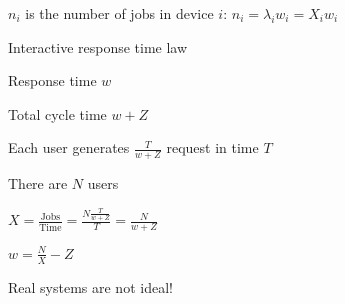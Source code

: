 		\item $n_i$ is the number of jobs in device $i$: $n_i = \lambda_iw_i = X_iw_i$
	\enumend
	\item Interactive response time law
	\enumstart
		\item Response time $w$
		\item Total cycle time $w+Z$
		\item Each user generates $\frac{T}{w+Z}$ request in time $T$
		\item There are $N$ users
		\item $X = \frac{\text{Jobs}}{\text{Time}} = \frac{N\frac{T}{w+Z}}{T} = \frac{N}{w+Z}$
		\item $w = \frac{N}{X} - Z$
	\enumend
	\item Real systems are not ideal!
\enumend
